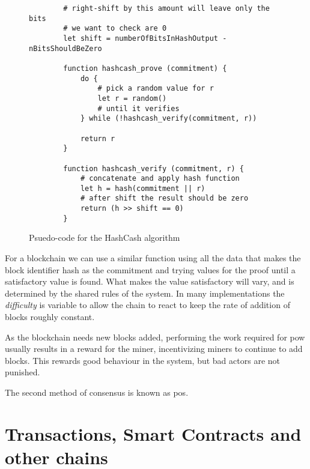 \begin{figure}[h]
    \centering
    \begin{lstlisting}
        # right-shift by this amount will leave only the bits
        # we want to check are 0
        let shift = numberOfBitsInHashOutput - nBitsShouldBeZero

        function hashcash_prove (commitment) {
            do {
                # pick a random value for r
                let r = random()
                # until it verifies
            } while (!hashcash_verify(commitment, r))

            return r
        }

        function hashcash_verify (commitment, r) {
            # concatenate and apply hash function
            let h = hash(commitment || r)
            # after shift the result should be zero
            return (h >> shift == 0)
        }

        \end{lstlisting}
    \caption{Psuedo-code for the HashCash algorithm}
    \label{fig:hashcash}
\end{figure}

For a blockchain we can use a similar function using all the data that makes the block identifier hash as the commitment and trying values for the proof until a satisfactory value is found. What makes the value satisfactory will vary, and is determined by the shared rules of the system. In many implementations the \emph{difficulty} is variable to allow the chain to react to keep the rate of addition of blocks roughly constant.

As the blockchain needs new blocks added, performing the work required for \gls{pow} usually results in a reward for the miner, incentivizing miners to continue to add blocks. This rewards good behaviour in the system, but bad actors are not punished.

The second method of consensus is known as \gls{pos}. 

\section{Transactions, Smart Contracts and other chains}
\label{ch:blockchain:types}



